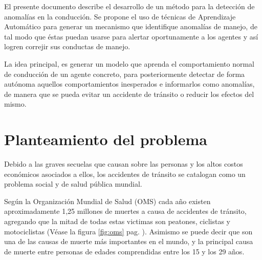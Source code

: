 
El presente documento describe el desarrollo de un m\'{e}todo para la detecci\'{o}n de anomal\'{i}as en la conducci\'{o}n. Se propone el uso de t\'{e}cnicas de Aprendizaje Autom\'{a}tico para generar un mecanismo que identifique anomal\'{i}as de manejo, de tal modo que \'{e}stas puedan usarse para alertar oportunamente a los agentes y as\'{i} logren correjir sus conductas de manejo.

\vspace{5mm} %

La idea principal, es generar un modelo que aprenda el comportamiento normal de conducci\'{o}n de un agente concreto, para posteriormente detectar de forma aut\'{o}noma aquellos comportamientos inesperados e informarlos como anomal\'{i}as, de manera que se pueda evitar  un accidente de tr\'{a}nsito o reducir los efectos del mismo.

\section{Planteamiento del problema}

Debido a las graves secuelas que causan sobre las personas y los altos costos econ\'{o}micos asociados a ellos, los accidentes de tr\'{a}nsito se catalogan como un problema social y de salud p\'{u}blica mundial.

\vspace{5mm} %

Seg\'{u}n la Organizaci\'{o}n Mundial de Salud (OMS) cada a\~{n}o existen aproximadamente 1,25 millones de muertes a causa de accidentes de tr\'{a}nsito, agregando que la mitad de todas estas victimas son peatones, ciclistas y motociclistas (V\'{e}ase la figura \ref{fig:oms} pag. \pageref{fig:oms}). Asimismo se puede decir que son una de las causas de muerte más importantes en el mundo, y la principal causa de muerte entre personas de edades comprendidas entre los 15 y los 29 años. 

\vspace{5mm} %

